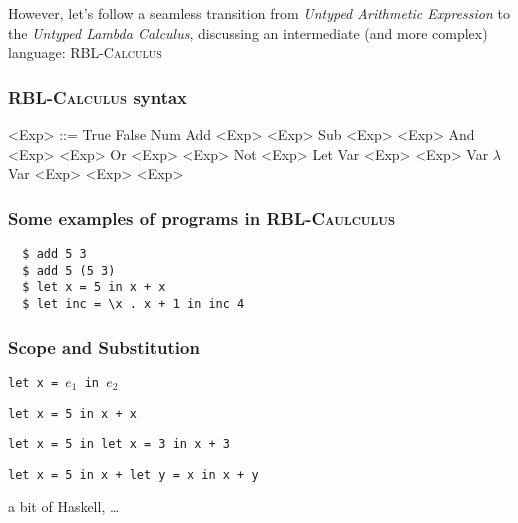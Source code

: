 \documentclass{beamer}
\begin{document}
\begin{frame}
  However, let's follow a seamless
  transition from \emph{Untyped Arithmetic Expression}
  to the \emph{Untyped Lambda Calculus}\pause, discussing
  an intermediate (and more complex) language: \textsc{RBL-Calculus} 
\end{frame}

\begin{frame}
  \frametitle{\textsc{RBL-Calculus} syntax}

\begin{grammar}
  <Exp> ::= True
  \alt False
  \alt Num
  \alt Add <Exp> <Exp> \alt Sub <Exp> <Exp> 
  \alt And <Exp> <Exp> \alt Or <Exp> <Exp> \alt Not <Exp>
  \alt Let Var <Exp> <Exp>
  \alt Var 
  \alt $\lambda$ Var  <Exp>
  \alt <Exp> <Exp> 
\end{grammar}
\end{frame}

\begin{frame}[fragile]
  \frametitle{Some examples of programs in \textsc{RBL-Caulculus}}

\begin{verbatim}
  $ add 5 3 
  $ add 5 (5 3) 
  $ let x = 5 in x + x
  $ let inc = \x . x + 1 in inc 4   
\end{verbatim} 
\end{frame}

\begin{frame}
  \frametitle{Scope and Substitution}

  \texttt{let x = $e_1$ in $e_2$} \pause
  
  \texttt{let x = 5 in x + x} \pause 

  \texttt{let x = 5 in let x = 3 in x + 3} \pause  

  \texttt{let x = 5 in x + let y = x in x + y} 

\end{frame}

\begin{frame}
\huge{a bit of Haskell, \ldots} 
\end{frame}
\end{document}
